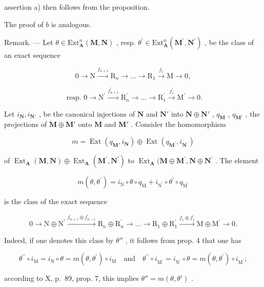 assertion a) then follows from the proposition.

The proof of \(b\) is analogous.

Remark. --- Let \(\theta\in\mathrm{Ext}_{\mathbf{A}}^{n}(\mathbf{M},\mathbf{N})\) , resp. \(\theta^{\prime}\in\mathrm{Ext}_{\mathbf{A}}^{n}(\mathbf{M}^{\prime},\mathbf{N}^{\prime})\) , be the class of an exact sequence

\[
0 \rightarrow \mathrm{N} \xrightarrow {f _ {n + 1}} \mathrm{R} _ {n} \rightarrow \dots \rightarrow \mathrm{R} _ {1} \xrightarrow {f _ {1}} \mathrm{M} \rightarrow 0,
\]

\[
\text { resp. } 0 \to \mathrm{N} ^ {\prime} \xrightarrow {f _ {n + 1} ^ {\prime}} \mathrm{R} _ {n} ^ {\prime} \to \dots \to \mathrm{R} _ {1} ^ {\prime} \xrightarrow {f _ {1} ^ {\prime}} \mathrm{M} ^ {\prime} \to 0.
\]

Let \(i_{\mathbf{N}}, i_{\mathbf{N}'}\) , be the canonical injections of \(\mathbf{N}\) and \(\mathbf{N}'\) into \(\mathbf{N} \oplus \mathbf{N}'\) , \(q_{\mathbf{M}}\) , \(q_{\mathbf{M}'}\) , the projections of \(\mathbf{M} \oplus \mathbf{M}'\) onto \(\mathbf{M}\) and \(\mathbf{M}'\) . Consider the homomorphism

\[
m = \operatorname{Ext} \left(q _ {\mathbf {M}}, i _ {\mathbf {N}}\right) \oplus \operatorname{Ext} \left(q _ {\mathbf {M} ^ {\prime}}, i _ {\mathbf {N} ^ {\prime}}\right)
\]

of \(\operatorname{Ext}_{\mathbf{A}}(\mathbf{M},\mathbf{N})\oplus \operatorname{Ext}_{\mathbf{A}}(\mathbf{M}^{\prime},\mathbf{N}^{\prime})\) to \(\operatorname{Ext}_{\mathbf{A}}(\mathbf{M}\oplus \mathbf{M}^{\prime},\mathbf{N}\oplus \mathbf{N}^{\prime}\) . The element

\[
m (\theta , \theta^ {\prime}) = i _ {\mathrm{N}} \circ \theta \circ q _ {\mathrm{M}} + i _ {\mathrm {N^ {\prime}}} \circ \theta^ {\prime} \circ q _ {\mathrm {M^ {\prime}}}
\]

is the class of the exact sequence

\[
0 \rightarrow \mathrm{N} \oplus \mathrm{N} ^ {\prime} \xrightarrow {f _ {n + 1} \oplus f _ {n - 1} ^ {\prime}} \mathrm{R} _ {n} \oplus \mathrm{R} _ {n} ^ {\prime} \rightarrow \dots \rightarrow \mathrm{R} _ {1} \oplus \mathrm{R} _ {1} ^ {\prime} \xrightarrow {f _ {1} \oplus f _ {1} ^ {\prime}} \mathrm{M} \oplus \mathrm{M} ^ {\prime} \rightarrow 0.
\]

Indeed, if one denotes this class by \(\theta''\) , it follows from prop. 4 that one has

\[
\theta^ {\prime \prime} \circ i _ {\mathrm{M}} = i _ {\mathrm{N}} \circ \theta = m (\theta , \theta^ {\prime}) \circ i _ {\mathrm{M}} \quad \text {and} \quad \theta^ {\prime \prime} \circ i _ {\mathrm{M} ^ {\prime}} = i _ {\mathrm{N} ^ {\prime}} \circ \theta = m (\theta , \theta^ {\prime}) \circ i _ {\mathrm{M} ^ {\prime}};
\]

according to X, p.~89, prop. 7, this implies \(\theta'' = m(\theta, \theta')\) .

